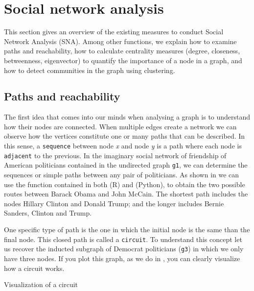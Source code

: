 \section{Social network analysis}
\label{sec:sna}

This section gives an overview of the existing measures to conduct Social Network Analysis (SNA). Among other functions, we explain how to examine paths and reachability, how to calculate centrality measures (degree, closeness, betweenness, eigenvector) to quantify the importance of a node in a graph, and how to detect communities in the graph using clustering.

\subsection{Paths and reachability}

The first idea that comes into our minds when analysing a graph is to understand how their nodes are connected. When multiple edges create a network we can observe how the vertices constitute one or many paths that can be described. In this sense, a \texttt{sequence} between node \textit{x} and node \textit{y} is a path where each node is \texttt{adjacent} to the previous. In the imaginary social network of friendship of American politicians contained in the undirected graph \texttt{g1}, we can determine the sequences or simple paths between any pair of politicians. As shown in  we can use the function  contained in both  (R) and  (Python), to obtain the two possible routes between Barack Obama and John McCain. The shortest path includes the nodes Hillary Clinton and Donald Trump; and the longer includes Bernie Sanders, Clinton and Trump.


One specific type of path is the one in which the initial node is the same than the final node. This closed path is called a \texttt{circuit}. To understand this concept let us recover the inducted subgraph of Democrat politicians (\texttt{g3}) in which we only have three nodes. If you plot this graph, as we do in , you can clearly visualize how a circuit works. 

\begin{ccsexample}
  \caption{Visualization of a circuit}
  \label{ex:circuit}
\end{ccsexample}


